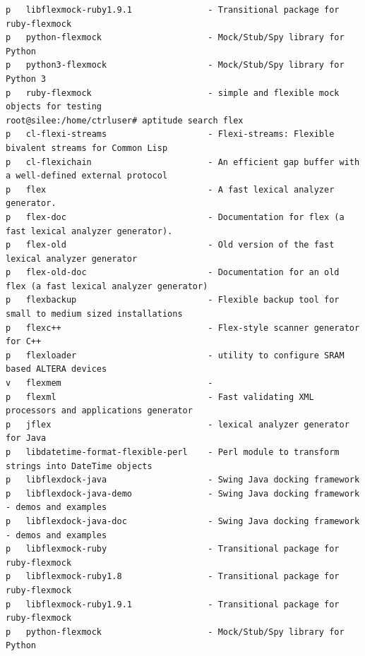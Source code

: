 \documentclass[11pt
  , a4paper
  , article
  , oneside
]{memoir}
\begin{document}
\begin{lstlisting}[style=termstyle]
p   libflexmock-ruby1.9.1               - Transitional package for ruby-flexmock                             
p   python-flexmock                     - Mock/Stub/Spy library for Python                                   
p   python3-flexmock                    - Mock/Stub/Spy library for Python 3                                 
p   ruby-flexmock                       - simple and flexible mock objects for testing                       
root@silee:/home/ctrluser# aptitude search flex
p   cl-flexi-streams                    - Flexi-streams: Flexible bivalent streams for Common Lisp           
p   cl-flexichain                       - An efficient gap buffer with a well-defined external protocol      
p   flex                                - A fast lexical analyzer generator.                                 
p   flex-doc                            - Documentation for flex (a fast lexical analyzer generator).        
p   flex-old                            - Old version of the fast lexical analyzer generator                 
p   flex-old-doc                        - Documentation for an old flex (a fast lexical analyzer generator)  
p   flexbackup                          - Flexible backup tool for small to medium sized installations       
p   flexc++                             - Flex-style scanner generator for C++                               
p   flexloader                          - utility to configure SRAM based ALTERA devices                     
v   flexmem                             -                                                                    
p   flexml                              - Fast validating XML processors and applications generator          
p   jflex                               - lexical analyzer generator for Java                                
p   libdatetime-format-flexible-perl    - Perl module to transform strings into DateTime objects             
p   libflexdock-java                    - Swing Java docking framework                                       
p   libflexdock-java-demo               - Swing Java docking framework - demos and examples                  
p   libflexdock-java-doc                - Swing Java docking framework - demos and examples                  
p   libflexmock-ruby                    - Transitional package for ruby-flexmock                             
p   libflexmock-ruby1.8                 - Transitional package for ruby-flexmock                             
p   libflexmock-ruby1.9.1               - Transitional package for ruby-flexmock                             
p   python-flexmock                     - Mock/Stub/Spy library for Python                                   

\end{lstlisting}
\end{document}

